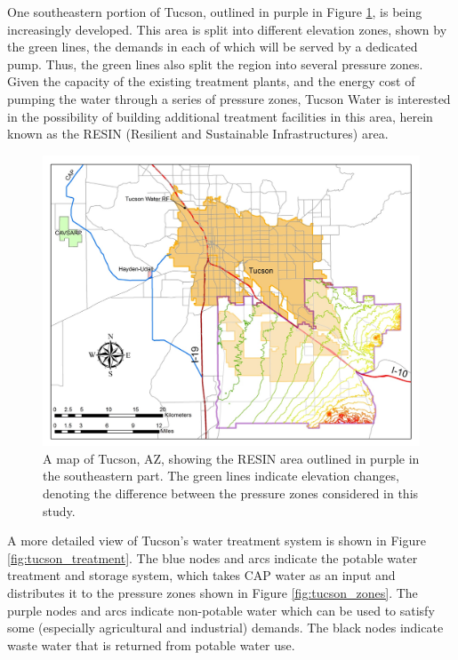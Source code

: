 \documentclass[opre,nonblindrev]{informs3} %
\begin{document}
One southeastern portion of Tucson, outlined in purple in Figure \ref{fig:tucson_elevation}, is being increasingly developed.
This area is split into different elevation zones, shown by the green lines, the demands in each of which will be served by a dedicated pump.
Thus, the green lines also split the region into several pressure zones.
Given the capacity of the existing treatment plants, and the energy cost of pumping the water through a series of pressure zones, Tucson Water is interested in the possibility of building additional treatment facilities  in this area, herein known as the RESIN (Resilient and Sustainable Infrastructures) area.

\begin{figure}
	\FIGURE
	{%
		\includegraphics*[width=.6\textwidth]{tucson_water_images/tucson_elevation.png}%
	}
	{
		A map of Tucson, AZ, showing the RESIN area outlined in purple in the southeastern part.
		The green lines indicate elevation changes, denoting the difference between the pressure zones considered in this study.
		\label{fig:tucson_elevation}
	}
	{}
\end{figure}

A more detailed view of Tucson's water treatment system is shown in Figure \ref{fig:tucson_treatment}.
The blue nodes and arcs indicate the potable water treatment and storage system, which takes CAP water as an input and distributes it to the pressure zones shown in Figure \ref{fig:tucson_zones}.
The purple nodes and arcs indicate non-potable water which can be used to satisfy some (especially agricultural and industrial) demands.
The black nodes indicate waste water that is returned from potable water use.
\end{document}
